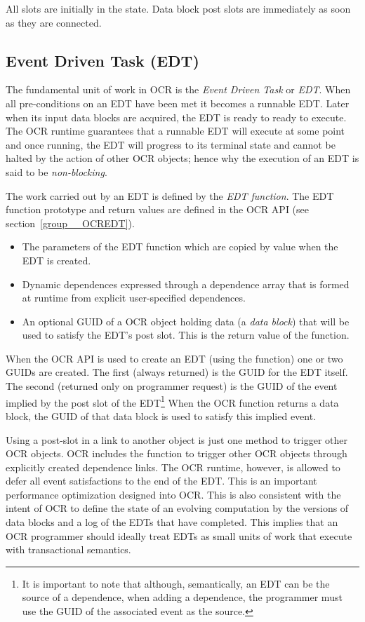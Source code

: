 All slots are initially in the  state. Data
block post slots are immediately  as soon as they are
connected.

\subsection{Event Driven Task (EDT)}
\label{sec:EDT}

The fundamental unit of work in OCR is
the \emph{Event Driven Task} or \emph{EDT}.
When all pre-conditions on an EDT have been met it becomes a runnable EDT.
Later when its
input data blocks are acquired, the EDT is ready to ready to execute.  The OCR
runtime guarantees that a runnable EDT will execute at some point and once running,
the EDT will progress to its terminal state
and cannot be halted by the action of other OCR objects; hence why the
execution of an EDT is said to be \emph{non-blocking}.

The work carried out by an EDT is defined by
the \emph{EDT function}. The EDT function prototype
and return values are defined in the OCR API (see section~\ref{group__OCREDT}).
\begin{itemize}
\item The parameters of the EDT function which are copied by value
when the EDT is created.
\item Dynamic dependences expressed through a dependence array that is
formed at runtime from explicit user-specified dependences.
\item An optional GUID of a OCR object holding data (a \emph{data
block}) that will be used to satisfy the EDT’s post slot. This is the
return value of the function.
\end{itemize}

When the OCR API is used to create an EDT (using the  function)
one or two GUIDs are created.  The first (always returned) is the GUID for the EDT itself.
The second (returned only on programmer request) is the GUID of the
event implied by the post slot of the EDT\footnote{It is important to
note that although, semantically, an EDT can be the source of a
dependence, when adding a dependence, the programmer must use the
GUID of the associated event as the source.}
When the OCR function returns a data block, the GUID of
that data block is used to satisfy this implied event.

Using a post-slot in a link to another object is just one method to
trigger other OCR objects. OCR includes the 
function to trigger other OCR objects through explicitly created dependence
links.  The OCR runtime, however, is allowed to defer all event satisfactions
to the end of the EDT.  This is an important performance optimization designed
into OCR.   This is also consistent with the intent of OCR to define the state
of an evolving computation by the versions of data blocks and a log of the
EDTs that have completed.   This implies that an OCR programmer should
ideally treat EDTs as small units of work that execute with transactional
semantics.

